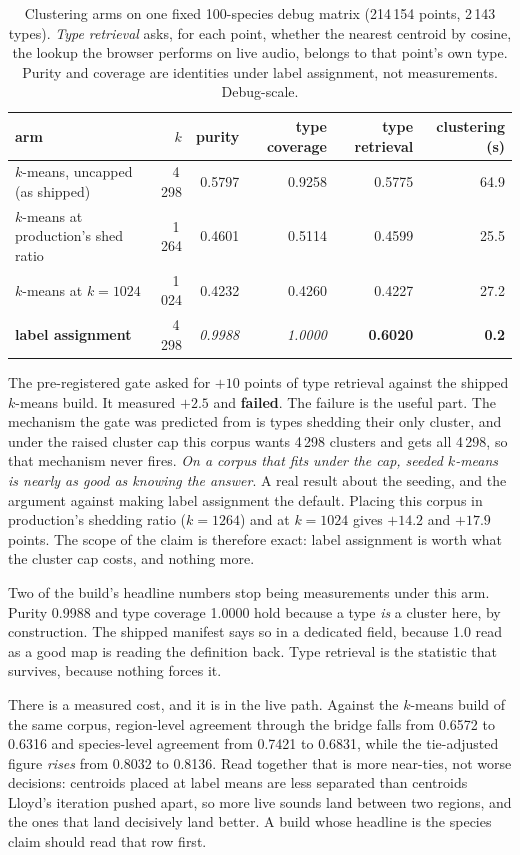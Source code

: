 \documentclass[10pt,twocolumn,a4paper]{article}
\begin{document}
\begin{table}[t]
\centering
\small
\caption{Clustering arms on one fixed 100-species debug matrix (214\,154 points, 2\,143
types). \emph{Type retrieval} asks, for each point, whether the nearest centroid by cosine, the lookup the browser
performs on live audio, belongs to that point's own type.
Purity and coverage are identities under label assignment, not measurements. Debug-scale.}
\label{tab:clustering}
\begin{tabular}{L{6.6cm} r r r r r}
\toprule
arm & $k$ & purity & type coverage & type retrieval & clustering (s) \\
\midrule
$k$-means, uncapped (as shipped) & 4\,298 & 0.5797 & 0.9258 & 0.5775 & 64.9 \\
$k$-means at production's shed ratio & 1\,264 & 0.4601 & 0.5114 & 0.4599 & 25.5 \\
$k$-means at $k = 1024$ & 1\,024 & 0.4232 & 0.4260 & 0.4227 & 27.2 \\
\textbf{label assignment} & 4\,298 & \emph{0.9988} & \emph{1.0000} & \textbf{0.6020} & \textbf{0.2} \\
\bottomrule
\end{tabular}
\end{table}

The pre-registered gate asked for $+10$ points of type retrieval against the shipped
$k$-means build. It measured $+2.5$ and \textbf{failed}. The failure is the useful part. The
mechanism the gate was predicted from is types shedding their only cluster, and under the
raised cluster cap this corpus wants 4\,298 clusters and gets all 4\,298, so that mechanism
never fires. \emph{On a corpus that fits under the cap, seeded $k$-means is nearly as good
as knowing the answer}. A real result about the seeding, and the argument against making
label assignment the default. Placing this corpus in production's shedding ratio
($k = 1264$) and at $k = 1024$ gives $+14.2$ and $+17.9$ points. The scope of the claim is
therefore exact: label assignment is worth what the cluster cap costs, and nothing more.

Two of the build's headline numbers stop being measurements under this arm. Purity 0.9988
and type coverage 1.0000 hold because a type \emph{is} a cluster here, by construction. The
shipped manifest says so in a dedicated field, because 1.0 read as a good map is reading the
definition back. Type retrieval is the statistic that survives, because nothing forces it.

There is a measured cost, and it is in the live path. Against the $k$-means build of the
same corpus, region-level agreement through the bridge falls from 0.6572 to 0.6316 and
species-level agreement from 0.7421 to 0.6831, while the tie-adjusted figure \emph{rises}
from 0.8032 to 0.8136. Read together that is more near-ties, not worse decisions:
centroids placed at label means are less separated than centroids Lloyd's iteration pushed
apart, so more live sounds land between two regions, and the ones that land decisively
land better. A build whose headline is the species claim should read that row first.
\end{document}
